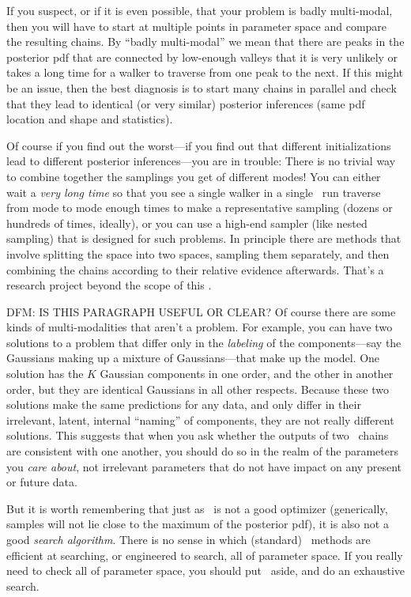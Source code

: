 \documentclass[12pt,twoside,pdftex]{article}
\newcommand{\MCMC}{\acronym{MCMC}}
\begin{document}
If you suspect, or if it is even possible, that your problem is badly
multi-modal, then you will have to start at multiple points in
parameter space and compare the resulting chains.
By ``badly multi-modal'' we mean that there are peaks in the posterior
pdf that are connected by low-enough valleys that it is very unlikely
or takes a long time for a walker to traverse from one peak to the
next.
If this might be an issue, then the best diagnosis is to start many
chains in parallel and check that they lead to identical (or very
similar) posterior inferences (same pdf location and shape and
statistics).

Of course if you find out the worst---if you find out that different
initializations lead to different posterior inferences---you are in
trouble:
There is no trivial way to combine together the samplings you get of
different modes!
You can either wait a \emph{very long time} so that you see a single
walker in a single \MCMC\ run traverse from mode to mode enough times to
make a representative sampling (dozens or hundreds of times, ideally),
or you can use a high-end sampler (like nested sampling) that is
designed for such problems.
In principle there are methods that involve splitting the space into
two spaces, sampling them separately, and then combining the chains
according to their relative evidence afterwards.
That's a research project beyond the scope of this \documentname.

DFM: IS THIS PARAGRAPH USEFUL OR CLEAR?
Of course there are some kinds of multi-modalities that aren't a
problem.
For example, you can have two solutions to a problem that differ only
in the \emph{labeling} of the components---say the Gaussians making up
a mixture of Gaussians---that make up the model.
One solution has the $K$ Gaussian components in one order, and the
other in another order, but they are identical Gaussians in all
other respects.
Because these two solutions make the same predictions for any data, and
only differ in their irrelevant, latent, internal ``naming'' of components,
they are not really different solutions.
This suggests that when you ask whether the outputs of two \MCMC\ chains
are consistent with one another, you should do so in the realm of the
parameters you \emph{care about}, not irrelevant parameters that do
not have impact on any present or future data.

But it is worth remembering that just as \MCMC\ is not a good optimizer
(generically, samples will not lie close to the maximum of the posterior pdf),
it is also not a good \emph{search algorithm}.
There is no sense in which (standard) \MCMC\ methods are efficient at
searching, or engineered to search, all of parameter space.
If you really need to check all of parameter space, you should put
\MCMC\ aside, and do an exhaustive search.
\end{document}
